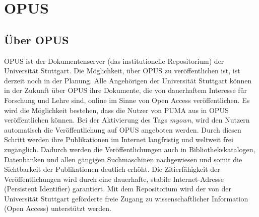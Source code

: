\section{OPUS}
\label{sec:opus}
\subsection{Über OPUS}
\label{subsec:ueberOpus}
OPUS ist der Dokumentenserver (das institutionelle Repositorium) der Universität Stuttgart. Die Möglichkeit, über OPUS zu veröffentlichen ist, ist derzeit noch in der Planung. Alle Angehörigen der Universität Stuttgart können in der Zukunft über OPUS ihre Dokumente, die von dauerhaftem Interesse für Forschung und Lehre sind, online im Sinne von Open Access veröffentlichen.
\newline\newline
Es wird die Möglichkeit bestehen, dass die Nutzer von PUMA aus in OPUS veröffentlichen können. Bei der Aktivierung des Tags \textit{myown}, wird den Nutzern automatisch die Veröffentlichung auf OPUS angeboten werden. Durch diesen Schritt werden ihre Publikationen im Internet langfristig und weltweit frei zugänglich. Dadurch werden die Veröffentlichungen auch in Bibliothekskatalogen, Datenbanken und allen gängigen Suchmaschinen nachgewiesen und somit die Sichtbarkeit der Publikationen deutlich erhöht.
\newline\newline
Die Zitierfähigkeit der Veröffentlichungen wird durch eine dauerhafte, stabile Internet-Adresse (Persistent Identifier) garantiert.
\newline\newline
Mit dem Repositorium wird der von der Universität Stuttgart geförderte freie Zugang zu wissenschaftlicher Information (Open Access) unterstützt werden.
